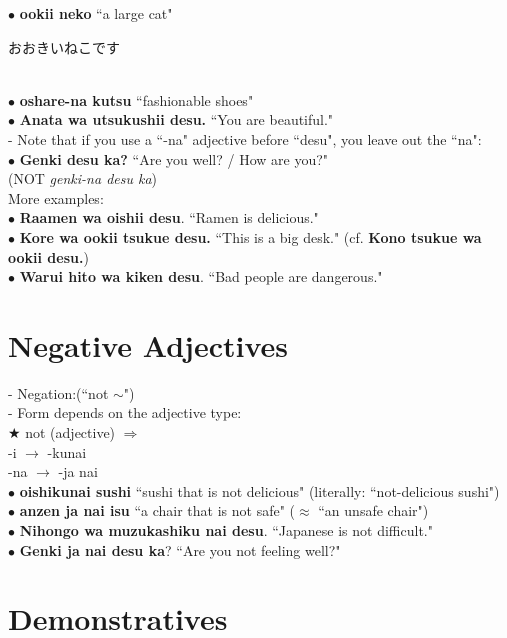 \documentclass[11pt]{article} %
\newcommand{\ee}{\vspace{.10cm}\\} %
\begin{document}
$\bullet$ \textbf{ookii neko} ``a large cat"\\
\begin{CJK}{UTF8}{min}おおきいねこです\end{CJK}\\
$\bullet$ \textbf{oshare-na kutsu} ``fashionable shoes"\ee

$\bullet$ \textbf{Anata wa utsukushii desu.} ``You are beautiful."\\
- Note that if you use a ``-na" adjective before ``desu", you leave out the ``na":\\
$\bullet$ \textbf{Genki desu ka?} ``Are you well? / How are you?"\\ (NOT \textit{genki-na desu ka})\ee

More examples:\\
$\bullet$ \textbf{Raamen wa oishii desu}.  ``Ramen is delicious."\\
$\bullet$ \textbf{Kore wa ookii tsukue desu.} ``This is a big desk." (cf. \textbf{Kono tsukue wa ookii desu.})\\
$\bullet$ \textbf{Warui hito wa kiken desu}.  ``Bad people are dangerous."\ee

\section{Negative Adjectives}

- Negation:(``not $\sim$")\\
- Form depends on the adjective type:\ee

$\bigstar$ not (adjective) $\Rightarrow$\\
-i $\rightarrow$ -kunai \\
-na $\rightarrow$ -ja nai \ee

$\bullet$ \textbf{oishikunai sushi} ``sushi that is not delicious" (literally: ``not-delicious sushi")\\
$\bullet$ \textbf{anzen ja nai isu} ``a chair that is not safe" ($\approx$ ``an unsafe chair")\\
$\bullet$ \textbf{Nihongo wa muzukashiku nai desu}. ``Japanese is not difficult."\\
$\bullet$ \textbf{Genki ja nai desu ka}?  ``Are you not feeling well?"\\

\section{Demonstratives}
\end{document}
